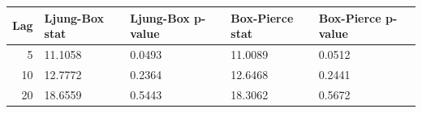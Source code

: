 \begin{tabular}{rllll}
\toprule
Lag & Ljung-Box stat & Ljung-Box p-value & Box-Pierce stat & Box-Pierce p-value \\
\midrule
5 & 11.1058 & 0.0493 & 11.0089 & 0.0512 \\
10 & 12.7772 & 0.2364 & 12.6468 & 0.2441 \\
20 & 18.6559 & 0.5443 & 18.3062 & 0.5672 \\
\bottomrule
\end{tabular}
